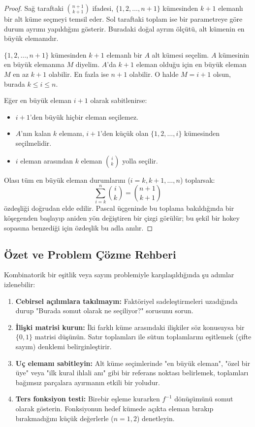 \begin{proof}
Sağ taraftaki $\binom{n+1}{k+1}$ ifadesi, $\{1, 2, \dots, n+1\}$ kümesinden $k+1$ elemanlı bir alt küme seçmeyi temsil eder. Sol taraftaki toplam ise bir parametreye göre durum ayrımı yapıldığını gösterir. Buradaki doğal ayrım ölçütü, alt kümenin en büyük elemanıdır.

$\{1, 2, \dots, n+1\}$ kümesinden $k+1$ elemanlı bir $A$ alt kümesi seçelim.
$A$ kümesinin en büyük elemanına $M$ diyelim.
$A$'da $k+1$ eleman olduğu için en büyük eleman $M$ en az $k+1$ olabilir. En fazla ise $n+1$ olabilir.
O halde $M = i+1$ olsun, burada $k \le i \le n$.

Eğer en büyük eleman $i+1$ olarak sabitlenirse:
\begin{itemize}
    \item $i+1$'den büyük hiçbir eleman seçilemez.
    \item $A$'nın kalan $k$ elemanı, $i+1$'den küçük olan $\{1, 2, \dots, i\}$ kümesinden seçilmelidir.
    \item $i$ eleman arasından $k$ eleman $\binom{i}{k}$ yolla seçilir.
\end{itemize}
Olası tüm en büyük eleman durumlarını ($i = k, k+1, \dots, n$) toplarsak:
\[ \sum_{i=k}^{n} \binom{i}{k} = \binom{n+1}{k+1} \]
özdeşliği doğrudan elde edilir. Pascal üçgeninde bu toplama bakıldığında bir köşegenden başlayıp aniden yön değiştiren bir çizgi görülür; bu şekil bir hokey sopasına benzediği için özdeşlik bu adla anılır.
\end{proof}

\subsection{Özet ve Problem Çözme Rehberi}

Kombinatorik bir eşitlik veya sayım problemiyle karşılaşıldığında şu adımlar izlenebilir:

\begin{enumerate}
    \item \textbf{Cebirsel açılımlara takılmayın:} Faktöriyel sadeleştirmeleri uzadığında durup "Burada somut olarak ne seçiliyor?" sorusunu sorun.
    \item \textbf{İlişki matrisi kurun:} İki farklı küme arasındaki ilişkiler söz konusuysa bir $\{0, 1\}$ matrisi düşünün. Satır toplamları ile sütun toplamlarını eşitlemek (çifte sayım) denklemi belirginleştirir.
    \item \textbf{Uç elemanı sabitleyin:} Alt küme seçimlerinde "en büyük eleman", "özel bir üye" veya "ilk kural ihlali anı" gibi bir referans noktası belirlemek, toplamları bağımsız parçalara ayırmanın etkili bir yoludur.
    \item \textbf{Ters fonksiyon testi:} Birebir eşleme kurarken $f^{-1}$ dönüşümünü somut olarak gösterin. Fonksiyonun hedef kümede açıkta eleman bırakıp bırakmadığını küçük değerlerle ($n=1, 2$) denetleyin.
\end{enumerate}
